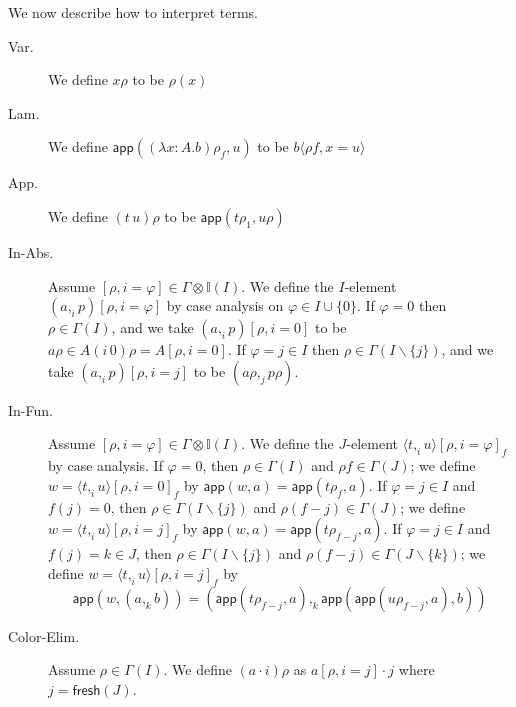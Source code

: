 \documentclass[english]{PaperTools/latex/lipics}
\newcommand\param[1]{\!\cdot\!#1}
\newcommand\fp[3]{⟨#2 ,_{#1} #3⟩}
\def\fresh#1{\mathsf{fresh}(#1)}
\def\app#1#2{\mathsf{app}(#1,#2)}
\begin{document}
\bigskip
We now describe how to interpret terms.
\begin{description}
  \item[\sc Var.]
    We define $xρ$ to be $ρ(x)$

  \item[\sc Lam.]
    We define $\app{(λ x:A.b)ρ_f}{u}$ to be $b⟨ρf,x=u⟩$

  \item[\sc App.]
    We define $(t\,u)ρ$ to be $\app{tρ_1}{uρ}$

  \item[\sc In-Abs.]
    Assume $[ρ,i=φ] ∈ Γ⊗𝕀(I)$.  We define the $I$-element $(a ,_i p)[ρ,i=φ]$
    by case analysis on $φ ∈ I ∪ \{0\}$.
    If $φ = 0$ then $ρ ∈ Γ(I)$, and we take $(a ,_i p)[ρ,i=0]$ to be
    $aρ ∈ A(i\,0)ρ = A[ρ,i=0]$.
    If $φ = j ∈ I$ then $ρ ∈ Γ(I\backslash\{j\})$, and we take
    $(a ,_i p)[ρ,i=j]$ to be $(aρ ,_j pρ)$.

  \item[\sc In-Fun.]
    Assume $[ρ,i=φ] ∈ Γ⊗𝕀(I)$.  We define the $J$-element ${\fp i t u}[ρ,i=φ]_f$
    by case analysis.
    If $φ = 0$, then $ρ ∈ Γ(I)$ and $ρf ∈ Γ(J)$; we define
    $w = {\fp i t u}[ρ,i=0]_f$ by $\app{w}{a} = \app{tρ_f}{a}$.
    If $φ = j ∈ I$ and $f(j) = 0$, then $ρ ∈ Γ(I\backslash\{j\})$ and $ρ(f-j) ∈ Γ(J)$;
    we define $w = {\fp i t u}[ρ,i=j]_f$ by $\app{w}{a} = \app{tρ_{f-j}}{a}$.
    If $φ = j ∈ I$ and $f(j) = k ∈ J$, then $ρ ∈ Γ(I\backslash\{j\})$ and $ρ(f-j) ∈ Γ(J\backslash\{k\})$;
    we define $w = {\fp i t u}[ρ,i=j]_f$ by
    $$\app{w}{(a ,_k b)} = ( \app{tρ_{f-j}}{a} ,_k {\app{\app{uρ_{f-j}}{a}}{b}} )$$

  \item[\sc Color-Elim.]
    Assume $ρ ∈ Γ(I)$.  We define $(a \param i)ρ$ as
    $a[ρ,i=j]·j$ where $j = \fresh{J}$.
\end{description}
\end{document}
